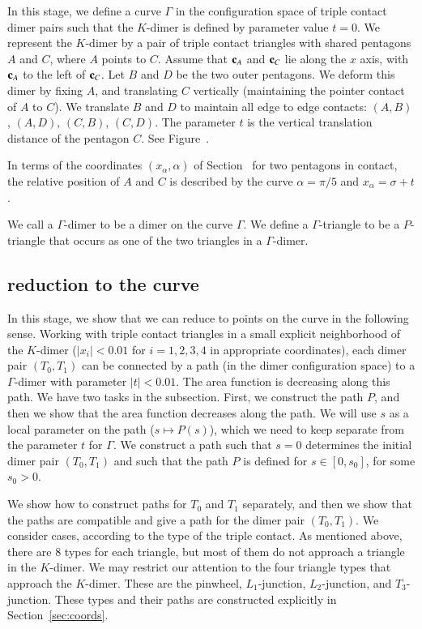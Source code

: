 In this stage, we define a curve $\Gamma$ in the configuration space of triple contact dimer pairs such that the $K$-dimer
is defined by parameter value $t=0$.  We represent the $K$-dimer by a pair of triple contact triangles with shared pentagons
$A$ and $C$, where $A$ points to $C$.  Assume that ${\mathbf c}_A$ and ${\mathbf c}_C$ lie along the $x$ axis, with ${\mathbf c}_A$ to the left
of ${\mathbf c}_C$.  Let $B$ and $D$ be the two outer pentagons.  We deform this dimer by fixing $A$,
and translating $C$ vertically (maintaining the pointer contact of $A$ to $C$).  We translate $B$ and $D$ to maintain
all edge to edge contacts: $(A,B)$, $(A,D)$, $(C,B)$, $(C,D)$.   The parameter $t$ is the vertical translation distance of the pentagon $C$.
See Figure~.


In terms of the coordinates $(x_\alpha,\alpha)$ of Section~ for two pentagons in contact, the relative position of $A$ and $C$
is described by the curve $\alpha=\pi/5$ and $x_\alpha = \sigma+t$.

We call a $\Gamma$-dimer to be a dimer on the curve $\Gamma$.  We define a $\Gamma$-triangle to be a $P$-triangle that
occurs as one of the two triangles in a $\Gamma$-dimer.


\subsection{reduction to the curve}

In this stage, we show that we can reduce to points on the curve in the following sense.
Working with triple contact triangles in a small explicit neighborhood of the
$K$-dimer ($|x_i|<0.01$ for $i=1,2,3,4$ in appropriate coordinates),
each dimer pair $(T_0,T_1)$ can be connected by a path (in the dimer configuration
space) to a $\Gamma$-dimer  with parameter $|t|<0.01$.
The area function is decreasing along this path.
We have two tasks in the subsection.  First, we construct the path $P$, and 
then we show that the area function decreases along the path.  We will use
$s$ as a local parameter on the path ($s\mapsto P(s)$), 
which we need to keep separate from
the parameter $t$ for $\Gamma$.  We construct a path such that $s=0$ determines the
initial dimer pair $(T_0,T_1)$ and such that the path $P$ is defined for $s\in [0,s_0]$, for some $s_0>0$.

We show how to construct paths for $T_0$ and $T_1$ separately, and then
we show that the paths are compatible and give a path for the dimer pair $(T_0,T_1)$.
We consider cases, according to the type of the triple contact.
As mentioned above, there are $8$ types for each triangle, but most of them do not
approach a triangle in the $K$-dimer.  We may restrict our attention
to the four triangle types that approach the $K$-dimer.   These are the pinwheel, $L_1$-junction,
$L_2$-junction, and $T_3$-junction.  
These types and their paths are constructed explicitly in  Section~\ref{sec:coords}.

